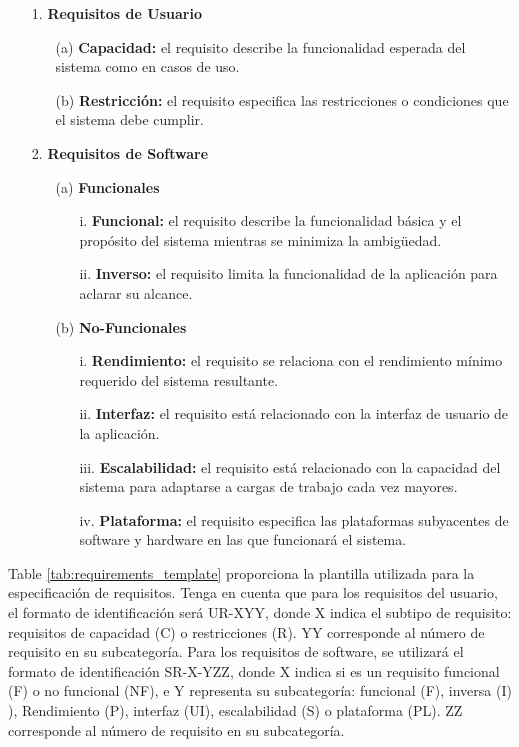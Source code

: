 \begin{itemize}
\item[1.] \textbf{Requisitos de Usuario} 
	\begin{itemize}
		\item[(a)] \textbf{Capacidad:} el requisito describe la funcionalidad esperada del sistema como en casos de uso.
		\item[(b)] \textbf{Restricción:} el requisito especifica las restricciones o condiciones que el sistema debe cumplir.
	\end{itemize}	
\end{itemize}

\begin{itemize}
\item[2.] \textbf{Requisitos de Software}
	\begin{itemize}
	\item[(a)] 	\textbf{Funcionales}
		\begin{itemize}
		\item[i.] 	\textbf{Funcional:} el requisito describe la funcionalidad básica y el propósito del sistema mientras se minimiza la ambigüedad.
		\item[ii.] 	\textbf{Inverso:} el requisito limita la funcionalidad de la aplicación para aclarar su alcance.
		\end{itemize}

	\item[(b)] 	\textbf{No-Funcionales}
		\begin{itemize}
		\item[i.] 	\textbf{Rendimiento:} el requisito se relaciona con el rendimiento mínimo requerido del sistema resultante.
		\item[ii.] 	\textbf{Interfaz:} el requisito está relacionado con la interfaz de usuario de la aplicación.
		\item[iii.] 	\textbf{Escalabilidad:} el requisito está relacionado con la capacidad del sistema para adaptarse a cargas de trabajo cada vez mayores.
		\item[iv.] 	\textbf{Plataforma:} el requisito especifica las plataformas subyacentes de software y hardware en las que funcionará el sistema.
		\end{itemize}			
	\end{itemize}
\end{itemize}

Table \ref{tab:requirements_template} proporciona la plantilla utilizada para la especificación de requisitos. Tenga en cuenta que para los requisitos del usuario, el formato de identificación será UR-XYY, donde X indica el subtipo de requisito: requisitos de capacidad (C) o restricciones (R). YY corresponde al número de requisito en su subcategoría. Para los requisitos de software, se utilizará el formato de identificación SR-X-YZZ, donde X indica si es un requisito funcional (F) o no funcional (NF), e Y representa su subcategoría: funcional (F), inversa (I) ), Rendimiento (P), interfaz (UI), escalabilidad (S) o plataforma (PL). ZZ corresponde al número de requisito en su subcategoría.

